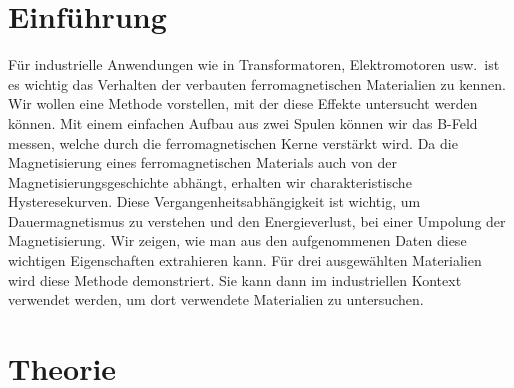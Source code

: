 \documentclass[a4paper,10pt,twocolumn]{article}
\begin{document}
    \section{Einführung}
    
    
    Für industrielle Anwendungen wie in Transformatoren, Elektromotoren usw.\ ist es wichtig das Verhalten 
    der verbauten ferromagnetischen Materialien zu kennen.
    Wir wollen eine Methode vorstellen, mit der diese Effekte untersucht werden können.
    Mit einem einfachen Aufbau aus zwei Spulen können wir das B-Feld messen,
    welche durch die ferromagnetischen Kerne verstärkt wird.
    Da die Magnetisierung eines ferromagnetischen Materials auch von der Magnetisierungsgeschichte abhängt,
    erhalten wir charakteristische Hysteresekurven.
    Diese Vergangenheitsabhängigkeit ist wichtig, um Dauermagnetismus zu verstehen und den Energieverlust,
    bei einer Umpolung der Magnetisierung.
    Wir zeigen, wie man aus den aufgenommenen Daten diese wichtigen Eigenschaften extrahieren kann.
    Für drei ausgewählten Materialien wird diese Methode demonstriert.
    Sie kann dann im industriellen Kontext verwendet werden, um dort verwendete Materialien zu untersuchen.
    
    \section{Theorie}
    \label{sec:Theory}
    
\end{document}
